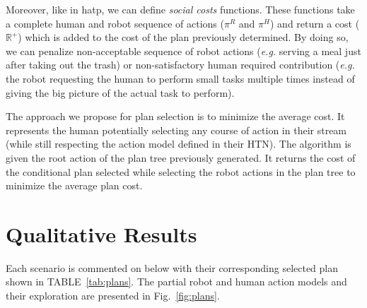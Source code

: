Moreover, like in \acrshort{hatp}, we can define \textit{social costs} functions. These functions take a complete human and robot sequence of actions ($\pi^R$ and $\pi^H$) and return a cost ($\mathbb{R}^+$) which is added to the cost of the plan previously determined. By doing so, we can penalize non-acceptable sequence of robot actions (\textit{e.g.} serving a meal just after taking out the trash) or non-satisfactory human required contribution (\textit{e.g.} the robot requesting the human to perform small tasks multiple times instead of giving the big picture of the actual task to perform).

The approach we propose for plan selection is to minimize the average cost. It represents the human potentially selecting any course of action in their stream (while still respecting the action model defined in their HTN).
The algorithm is given the root action of the plan tree previously generated. It returns the cost of the conditional plan selected while selecting the robot actions in the plan tree to minimize the average plan cost.

\section{Qualitative Results}

Each scenario is commented on below with their corresponding selected plan shown in TABLE~\ref{tab:plans}. The partial robot and human action models and their exploration are presented in Fig.~\ref{fig:plans}.

